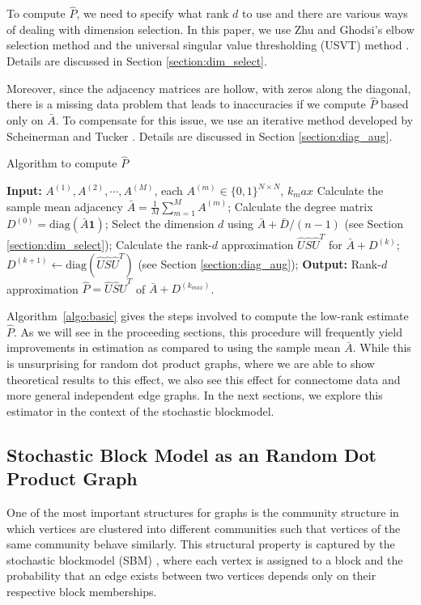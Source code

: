 \documentclass[a4paper]{article}
\begin{document}
To compute $\hat{P}$, we need to specify what rank $d$ to use and there are various ways of dealing with dimension selection. 
In this paper, we use Zhu and Ghodsi's elbow selection method \cite{zhu2006automatic} and the universal singular value thresholding (USVT) method \cite{chatterjee2015matrix}. 
Details are discussed in Section \ref{section:dim_select}.

Moreover, since the adjacency matrices are hollow, with zeros along the diagonal, there is a missing data problem that leads to inaccuracies if we compute $\hat{P}$ based only on $\bar{A}$. 
To compensate for this issue, we use an iterative method developed by Scheinerman and Tucker \cite{scheinerman2010modeling}. 
Details are discussed in Section \ref{section:diag_aug}.


\begin{algorithm}[H]
\caption{Algorithm to compute $\hat{P}$}
\label{algo:basic}
\begin{algorithmic}[1]
\STATE \textbf{Input:} $A^{(1)}, A^{(2)}, \cdots, A^{(M)}$, each $A^{(m)} \in \{0,1\}^{N \times N}$, $k_max$
\STATE Calculate the sample mean adjacency $\bar{A} = \frac{1}{M}\sum\limits_{m = 1}^M A^{(m)}$;
\STATE Calculate the degree matrix $D^{(0)} = \mathrm{diag}(\bar{A} \bm{1})$;
\STATE Select the dimension $d$  using $\bar{A} + \bar{D}/(n-1)$ (see Section \ref{section:dim_select});
\STATE Calculate the rank-$d$ approximation $\hat{U} \hat{S} \hat{U}^T$ for $\bar{A} + D^{(k)}$;
\STATE $D^{(k+1)} \leftarrow \mathrm{diag}(\hat{U} \hat{S} \hat{U}^T)$ (see Section \ref{section:diag_aug}); 
\ENDFOR
\STATE \textbf{Output:} Rank-$d$ approximation $\hat{P}=\hat{U} \hat{S} \hat{U}^T$ of $\bar{A} + D^{(k_{max})}$.
\end{algorithmic}
\end{algorithm}


Algorithm~\ref{algo:basic} gives the steps involved to compute the low-rank estimate $\hat{P}$.
As we will see in the proceeding sections, this procedure will frequently yield improvements in estimation as compared to using the sample mean $\bar{A}$.
While this is unsurprising for random dot product graphs, where we are able to show theoretical results to this effect, we also see this effect for connectome data and more general independent edge graphs.
In the next sections, we explore this estimator in the context of the stochastic blockmodel.

\subsection{Stochastic Block Model as an Random Dot Product Graph}
\label{section:sbm_rdpg}
One of the most important structures for graphs is the community structure in which vertices are clustered into different communities such that vertices of the same community behave similarly. This structural property is captured by the stochastic blockmodel (SBM) \cite{holland1983stochastic}, where each vertex is assigned to a block and the probability that an edge exists between two vertices depends only on their respective block memberships.
\end{document}
